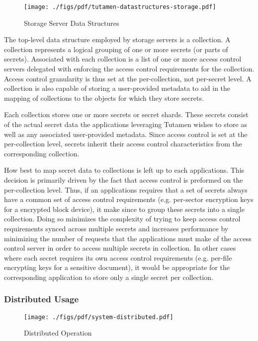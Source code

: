 \begin{figure}[th]
  \centering
  \texttt{[image: ./figs/pdf/tutamen-datastructures-storage.pdf]}
  \caption{Storage Server Data Structures}
  \label{fig:tutamen:storagestructs}
\end{figure}

The top-level data structure employed by storage servers is a
collection. A collection represents a logical grouping of one or more
secrets (or parts of secrets). Associated with each collection is a
list of one or more access control servers delegated with enforcing
the access control requirements for the collection. Access control
granularity is thus set at the per-collection, not per-secret level. A
collection is also capable of storing a user-provided metadata to aid
in the mapping of collections to the objects for which they store
secrets.

Each collection stores one or more secrets or secret shards. These
secrets consist of the actual secret data the applications leveraging
Tutamen wishes to store as well as any associated user-provided
metadata. Since access control is set at the per-collection level,
secrets inherit their access control characteristics from the
corresponding collection.

How best to map secret data to collections is left up to each
applications. This decision is primarily driven by the fact that
access control is preformed on the per-collection level. Thus, if an
applications requires that a set of secrets always have a common set
of access control requirements (e.g. per-sector encryption keys for a
encrypted block device), it make since to group these secrets into a
single collection. Doing so minimizes the complexity of trying to keep
access control requirements synced across multiple secrets and
increases performance by minimizing the number of requests that the
applications must make of the access control server in order to access
multiple secrets in collection. In other cases where each secret
requires its own access control requirements (e.g. per-file encrypting
keys for a sensitive document), it would be appropriate for the
corresponding application to store only a single secret per
collection.

\subsubsection{Distributed Usage}

\begin{figure}[th]
  \centering
  \texttt{[image: ./figs/pdf/system-distributed.pdf]}
  \caption{Distributed Operation}
  \label{fig:tutamen:systemdistributed}
\end{figure}

